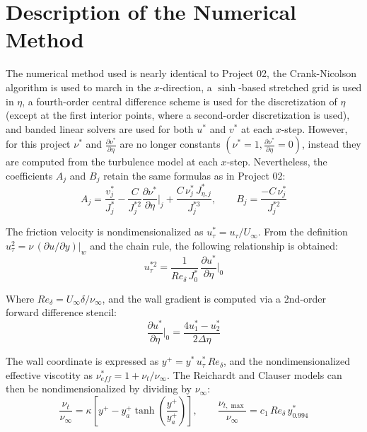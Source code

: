 \documentclass[letterpaper,12pt]{article}
\begin{document}

\section{Description of the Numerical Method}
The numerical method used is nearly identical to Project 02, the Crank-Nicolson algorithm is used to march in the $x$-direction, a $\sinh$-based stretched grid is used in $\eta$, a fourth-order central difference scheme is used for the discretization of $\eta$ (except at the first interior points, where a second-order discretization is used), and banded linear solvers are used for both $u^*$ and $v^*$ at each $x$-step. However, for this project $\nu^*$ and $\frac{\partial \nu^*}{\partial \eta}$ are no longer constants $(\nu^* = 1, \frac{\partial \nu^*}{\partial \eta} = 0)$, instead they are computed from the turbulence model at each $x$-step. Nevertheless, the coefficients $A_j$ and $B_j$ retain the same formulas as in Project 02:
\begin{equation}
    A_j = \frac{v^*_j}{J^*_j} - \frac{C}{J^{*2}_j}\frac{\partial \nu^*}{\partial \eta}\bigg|_j + \frac{C\,\nu^*_j\, J^*_{\eta,j}}{J^{*3}_j}, \qquad B_j = \frac{-C\,\nu^*_j}{J^{*2}_j}
\end{equation}

The friction velocity is nondimensionalized as $u_{\tau}^* = u_{\tau} / U_{\infty}$. From the definition $u_{\tau}^2 = \nu\,(\partial u/\partial y)|_w$ and the chain rule, the following relationship is obtained:
\begin{equation}
u_{\tau}^{*2} = \frac{1}{Re_\delta \, J^{*}_0} \, \frac{\partial u^*}{\partial \eta}\bigg|_0
\end{equation}

Where $Re_\delta = U_\infty \delta / \nu_\infty$, and the wall gradient is computed via a 2nd-order forward difference stencil: 
\begin{equation}
\frac{\partial u^*}{\partial \eta}\bigg|_0 = \frac{4 u^*_1 - u^*_2}{2 \Delta \eta}
\end{equation} 

The wall coordinate is expressed as $y^+ = y^* \, u_\tau^* \, Re_\delta$, and the nondimensionalized effective viscotity as $\nu_{eff}^* = 1 + \nu_t / \nu_{\infty}$. The Reichardt and Clauser models can then be nondimensionalized by dividing by $\nu_\infty$:
\begin{equation}
\frac{\nu_t}{\nu_\infty} = \kappa \left[y^+ - y^+_a \tanh \left(\frac{y^+}{y^+_a} \right)\right], \qquad \frac{\nu_{t, \max}}{\nu_\infty} = c_1 \, Re_\delta \, y^*_{0.994}
\end{equation}
\end{document}
